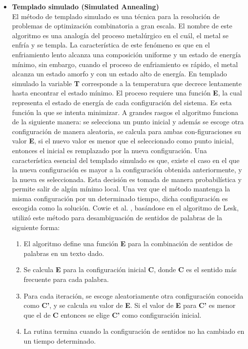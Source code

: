 \begin{itemize}
    \item \textbf{Templado simulado (Simulated Annealing)} \\
    El método de templado simulado es una técnica para la resolución de problemas de optimización combinatoria a gran escala. El nombre de este algoritmo es una analogía del proceso metalúrgico en el cuál, el metal se enfría y se templa. La característica de este fenómeno es que en el enfriamiento lento alcanza una composición uniforme y un estado de energía mínimo, sin embargo, cuando el proceso de enfriamiento es rápido, el metal alcanza un estado amorfo y con un estado alto de energía. En templado simulado la variable \textbf{T} corresponde a la temperatura que decrece lentamente hasta encontrar el estado mínimo.
    El proceso requiere una función \textbf{E}, la cual representa el estado de energía de cada configuración del sistema. Es esta función la que se intenta minimizar. A grandes rasgos el algoritmo funciona de la siguiente manera: se selecciona un punto inicial y además se escoge otra configuración de manera aleatoria, se calcula para ambas con-figuraciones su valor \textbf{E}, si el nuevo valor es menor que el seleccionado como punto inicial, entonces el inicial es remplazado por la nueva configuración. Una característica esencial del templado simulado es que, existe el caso en el que la nueva configuración es mayor a la configuración obtenida anteriormente, y la nueva es seleccionada. Esta decisión es tomada de manera probabilística y permite salir de algún mínimo local. Una vez que el método mantenga la misma configuración por un determinado tiempo, dicha configuración es escogida como la solución.
    Cowie et al. \cite{005}, basándose en el algoritmo de Lesk, utilizó este método para desambiguación de sentidos de palabras de la siguiente forma:
    \begin{enumerate}
      \item El algoritmo define una función \textbf{E} para la combinación de sentidos de palabras en un texto dado.
      \item Se calcula \textbf{E} para la configuración inicial \textbf{C}, donde \textbf{C} es el sentido más frecuente para cada palabra.
      \item Para cada iteración, se escoge aleatoriamente otra configuración conocida como \textbf{C’}, y se calcula su valor de \textbf{E}. Si el valor de \textbf{E} para \textbf{C’} es menor que el de \textbf{C} entonces se elige \textbf{C’} como configuración inicial.
      \item  La rutina termina cuando la configuración de sentidos no ha cambiado en un tiempo determinado.
    \end{enumerate}


\end{itemize}

